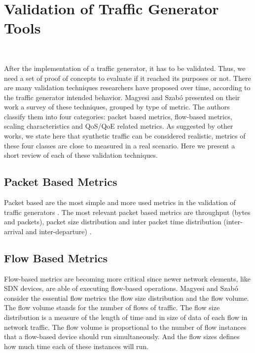 \section{Validation of Traffic Generator Tools}~\label{sec:validation-traffic-gen}

After the implementation of a traffic generator, it has to be validated. Thus, we need a set of proof of concepts to evaluate if it reached its purposes or not. 
There are many validation techniques researchers have proposed over time, according to the traffic generator intended behavior.  Magyesi and Szabó\cite{validate-trafficgen} presented on their work a survey of these techniques, grouped by type of metric. The authors classify them into four categories: packet based metrics, flow-based metrics, scaling characteristics and QoS/QoE related metrics. As suggested by other works\cite{swing-paper}, we state here that synthetic traffic can be considered realistic, metrics of these four classes are close to measured in a real scenario. Here we present a short review of each of these validation techniques. 


\subsection{Packet Based Metrics}

Packet based are the most simple and more used metrics in the validation of traffic generators \cite{validate-trafficgen}. The most relevant packet based metrics are throughput\cite{do-you-trust}\cite{comparative-trafficgen-tools}\cite{performance-trafficgen}\cite{moongen-paper} (bytes and packets), packet size distribution\cite{packet-distribution-model} and inter packet time distribution (inter-arrival and inter-departure) \cite{sourcesonoff-paper} \cite{ditg-paper}.       


\subsection{Flow Based Metrics}

Flow-based metrics are becoming more critical since newer network elements, like SDN devices, are able of executing flow-based operations\cite{validate-trafficgen}\cite{sdn-survey}. Magyesi and Szabó\cite{validate-trafficgen} consider the essential flow metrics the flow size distribution and the flow volume. The flow volume stands for the number of flows of traffic. The flow size distribution is a measure of the length of time and in size of data of each flow in network traffic. The flow volume is proportional to the number of flow instances that a flow-based device should run simultaneously. And the flow sizes defines how much time each of these instances will  run.


